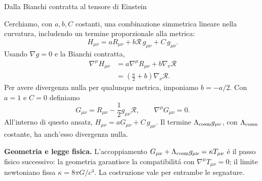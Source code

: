 \begin{frame}[t]{Dalla Bianchi contratta al tensore di Einstein}
\small\raggedright
Cerchiamo, con $a,b,C$ costanti, una combinazione simmetrica
lineare nella curvatura, includendo un termine proporzionale alla metrica:
\[
H_{\mu\nu}=aR_{\mu\nu}+b\mathcal R\,g_{\mu\nu}+C\,g_{\mu\nu}.
\]
Usando $\nabla g=0$ e la Bianchi contratta,
\[
\begin{aligned}
\nabla^\mu H_{\mu\nu}
&=a\nabla^\mu R_{\mu\nu}+b\nabla_\nu\mathcal R\\
&=\left(\frac a2+b\right)\nabla_\nu\mathcal R.
\end{aligned}
\]
Per avere divergenza nulla per qualunque metrica, imponiamo
$b=-a/2$. Con $a=1$ e $C=0$ definiamo
\[
\boxed{G_{\mu\nu}=R_{\mu\nu}-\frac12g_{\mu\nu}\mathcal R},
\qquad
\boxed{\nabla^\mu G_{\mu\nu}=0}.
\]
All'interno di questo ansatz, $H_{\mu\nu}=aG_{\mu\nu}+C\,g_{\mu\nu}$.
Il termine $\Lambda_{\rm cosm}g_{\mu\nu}$, con $\Lambda_{\rm cosm}$ costante,
ha anch'esso divergenza nulla.

\medskip
\textbf{Geometria e legge fisica.}
L'accoppiamento $G_{\mu\nu}+\Lambda_{\rm cosm}g_{\mu\nu}=\kappa T_{\mu\nu}$
\'e il passo fisico successivo: la geometria garantisce la compatibilit\'a
con $\nabla^\mu T_{\mu\nu}=0$; il limite newtoniano fissa
$\kappa=8\pi G/c^4$.
La costruzione vale per entrambe le segnature.
\end{frame}

